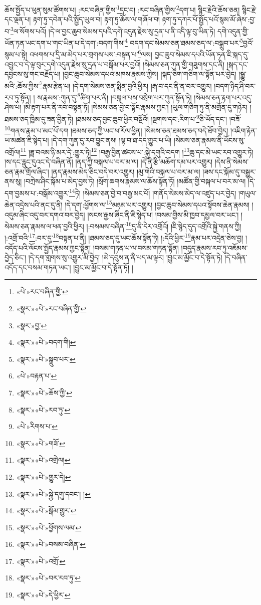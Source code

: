 ཆོས་སྤྱོད་པ་ཕུན་སུམ་ཚོགས་པ། :རང་བཞིན་གྱིས་\footnote{«པེ་»རང་བཞིན་གྱི་}དྲང་བ། :རང་བཞིན་གྱིས་\footnote{«སྣར་»«པེ་»རང་བཞིན་གྱི་}དག་པ། སྙིང་རྗེའི་ཆོས་ཅན། སྙིང་རྗེ་དང་ལྡན་པ། རྟག་ཏུ་དབེན་པའི་སྤྱོད་ཡུལ་བ། རྟག་ཏུ་ཆོས་ལ་གཞོལ་བ། རྟག་ཏུ་དཀར་པོ་སྤྱོད་པའོ་སྙམ་མོ་ཞེས་:བྱ་བ་\footnote{«སྣར་»བྱ་}ལ་སོགས་པའོ། །དེ་ལ་བྱང་ཆུབ་སེམས་དཔའི་དགེ་འདུན་རྗེས་སུ་དྲན་པ་ནི་འདི་ལྟ་བུ་ཡིན་ཏེ། དགེ་འདུན་གྱི་ཡོན་ཏན་ཡང་དག་པ་གང་ཡིན་པ་དེ་དག་:བདག་གིས།\footnote{«སྣར་»«པེ་»བདག་གི།} བདག་དང་སེམས་ཅན་ཐམས་ཅད་ལ་:བསྒྲུབ་པར་\footnote{«སྣར་»«པེ་»སྒྲུབ་པར་}བྱའོ་སྙམ་པ་སྟེ། འཕགས་པ་དྲི་མ་མེད་པར་གྲགས་པས་:བསྟན་པ་\footnote{«པེ་»བརྟན་པ་}ལས། བྱང་ཆུབ་སེམས་དཔའི་ཡོན་ཏན་ཇི་སྐད་དུ་འབྱུང་བ་དེ་ལྟ་བུར་དགེ་འདུན་རྗེས་སུ་དྲན་པ་བསྒོམ་པར་བྱའོ། །སེམས་ཅན་ཀུན་གྱི་གཟུགས་དང་ནི། །སྐད་དང་དབྱངས་སུ་གང་བརྗོད་པ། །བྱང་ཆུབ་སེམས་དཔའ་མཁས་རྣམས་ཀྱིས། །སྐད་ཅིག་གཅིག་ལ་སྟོན་པར་བྱེད། །སྒྱུ་མའི་:ཆོས་ཀྱིས་\footnote{«སྣར་»«པེ་»ཆོས་ཀྱི་}རྣམ་རྩེན་པ། །དེ་དག་སེམས་ཅན་སྨིན་བྱའི་ཕྱིར། །རྒ་བ་དང་ནི་ན་བར་འགྱུར། །བདག་ཉིད་ཤི་བར་རབ་ཏུ་སྟོན། །
ས་རྣམས་:ཀུན་དུ་\footnote{«སྣར་»«པེ་»རབ་ཏུ་}ཚིག་པར་ནི། །བསྐལ་པས་བསྲེག་པར་ཀུན་སྟོན་ཏེ། །སེམས་ཅན་རྟག་པར་འདུ་ཤེས་པ། །མི་རྟག་པར་ནི་རབ་བསྟན་ཏོ། །སེམས་ཅན་བྱེ་བ་སྟོང་རྣམས་ཀྱང་། །ཡུལ་གཅིག་ཏུ་ནི་མགྲོན་དུ་གཉེར། །ཐམས་ཅད་ཁྱིམ་དུ་ཟན་བྱིན་ཏེ། །ཐམས་ཅད་བྱང་ཆུབ་ཕྱིར་བསྔོའོ། །སྔགས་དང་:རིག་པ་\footnote{«པེ་»རིགས་པ་}ཅི་ཡོད་དང་། །བཟོ་\footnote{«སྣར་»«པེ་»གཟོ་}གནས་རྣམ་པ་མང་པོ་དག །ཐམས་ཅད་ཀྱི་ཡང་ཕ་རོལ་ཕྱིན། །སེམས་ཅན་ཐམས་ཅད་བདེ་ཐོབ་བྱེད། །འཇིག་རྟེན་ཡ་མཚན་ཇི་སྙེད་པ། །དེ་དག་ཀུན་དུ་རབ་བྱུང་ནས། །ལྟ་བ་ཐ་དད་གྱུར་པ་ཡི། །སེམས་ཅན་རྣམས་ནི་ཡོངས་སུ་འགྲོལ།\footnote{«སྣར་»«པེ་»འགྲེལ།} །ཟླ་བའམ་ཉི་མར་དེ་:གྱུར་ཏེ།\footnote{«སྣར་»«པེ་»གྱུར་དེ།} །བརྒྱ་བྱིན་ཚངས་པ་:སྐྱེ་དགུའི་བདག །\footnote{«སྣར་»«པེ་»སྐྱེ་དགུ་དབང་། །}ཆུ་དང་མེ་ཡང་རབ་འགྱུར་ཏེ། །ས་དང་རླུང་དུའང་དེ་བཞིན་ནོ། །ནད་ཀྱི་བསྐལ་པ་བར་མ་ལ། །དེ་ནི་རྩི་མཆོག་དམ་པར་འགྱུར། །དེས་ནི་སེམས་ཅན་རྣམ་གྲོལ་ཞིང་། །ནད་རྣམས་མེད་ཅིང་བདེ་བར་འགྱུར། །མུ་གེའི་བསྐལ་པ་བར་མ་ལ། །ཟས་དང་སྐོམ་དུ་བསྒྱུར་ནས་སུ། །བཀྲེས་ཤིང་སྐོམ་པ་མེད་བྱས་ཏེ། །སྲོག་ཆགས་རྣམས་ལ་ཆོས་སྟོན་ཏོ། །མཚོན་གྱི་བསྐལ་པ་བར་མ་ལ། །དེ་དག་བྱམས་པ་:བསྒོམ་འགྱུར་\footnote{«སྣར་»«པེ་»སྒོམ་གྱུར་}ཏེ། །སེམས་ཅན་བྱེ་བ་བརྒྱ་མང་པོ། །གནོད་སེམས་མེད་ལ་འཛུད་པར་བྱེད། །གཡུལ་ཆེན་འདྲེས་པའི་ནང་དུ་ནི། །དེ་དག་:ཕྱོགས་ལ་\footnote{«སྣར་»«པེ་»ཕྱོགས་ལམ་}མཉམ་པར་འགྱུར། །བྱང་ཆུབ་སེམས་དཔའ་སྟོབས་ཆེན་རྣམས། །འདུམ་ཞིང་འདུ་བར་དགའ་བར་བྱེད། །སངས་རྒྱས་ཞིང་ནི་ཇི་སྙེད་པ། །བསམ་གྱིས་མི་ཁྱབ་དམྱལ་བར་ཡང་། །སེམས་ཅན་རྣམས་ལ་ཕན་བྱའི་ཕྱིར། །:བསམས་བཞིན་\footnote{«སྣར་»«པེ་»བསམ་བཞིན་}དུ་ནི་དེར་འགྲོའོ། །ཇི་སྙེད་དུད་འགྲོའི་སྐྱེ་གནས་ཀྱི། །:འགྲོ་བའི་\footnote{«སྣར་»«པེ་»འགྲོ་}:བར་དུ་\footnote{«སྣར་»«པེ་»བར་རབ་ཏུ་}བསྟན་པ་ནི། །ཐམས་ཅད་དུ་ཡང་ཆོས་སྟོན་ཏེ། །:དེའི་ཕྱིར་\footnote{«སྣར་»«པེ་»དེ་ཕྱིར་}རྣམ་པར་འདྲེན་ཅེས་བྱ། །འདོད་པའི་ལོངས་སྤྱོད་རྣམས་ཀྱང་སྟོན། །བསམ་གཏན་པ་ལ་བསམ་གཏན་སྟོན། །བདུད་རྣམས་རབ་ཏུ་འཇོམས་བྱེད་ཅིང་། །དེ་དག་གླགས་སུ་འགྱུར་མི་བྱེད། །མེ་དབུས་ན་ནི་པད་མ་ལྟར། །བྱུང་མ་མྱོང་བ་དེ་སྟོན་ཏེ། །དེ་བཞིན་འདོད་དང་བསམ་གཏན་ཡང་། །བྱུང་མ་མྱོང་བ་དེ་སྟོན་ཏོ། །
